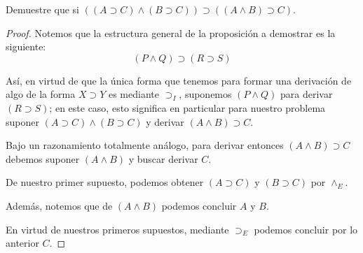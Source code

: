 \documentclass{article}
\begin{document}
\begin{example}
    Demuestre que si $((A \supset C) \land (B \supset C)) \supset ((A \land B) \supset C)$.

    \begin{proof}
        \hfill \newline

        Notemos que la estructura general de la proposición a demostrar es la siguiente:
        $$
            (P \land Q) \supset (R \supset S)
        $$

        Así, en virtud de que la única forma que tenemos para formar una derivación de algo
        de la forma $X \supset Y$ es mediante $\supset_I$, suponemos $(P \land Q)$ para
        derivar $(R \supset S)$; en este caso, esto significa en particular para nuestro
        problema suponer $(A \supset C) \land (B \supset C)$ y derivar $(A \land B) \supset C$.

        \begin{prooftree}
        \end{prooftree}

        Bajo un razonamiento totalmente análogo, para derivar entonces $(A \land B) \supset C$
        debemos suponer $(A \land B)$ y buscar derivar $C$.

        \begin{prooftree}
        \end{prooftree}

        De nuestro primer supuesto, podemos obtener $(A \supset C)$ y $(B \supset C)$ por $\land_E$.

        \begin{prooftree}
        \end{prooftree}

        Además, notemos que de $(A \land B)$ podemos concluir $A$ y $B$. 
        
        \begin{prooftree}
        \end{prooftree}

        En virtud de nuestros primeros supuestos, mediante $\supset_E$ podemos 
        concluir por lo anterior $C$. 


\end{proof}
\end{example}
\end{document}
